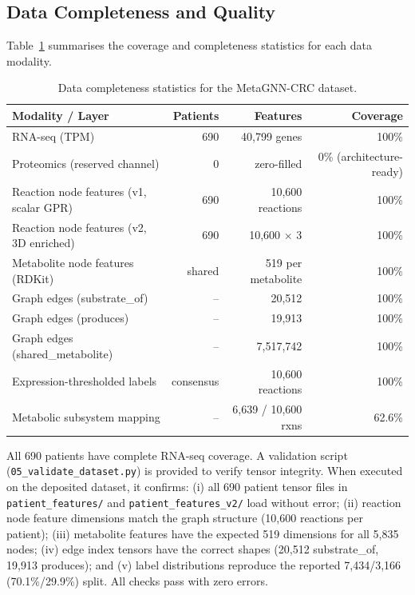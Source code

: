 \documentclass[12pt,a4paper]{article}
\begin{document}
\subsection{Data Completeness and Quality}

Table~\ref{tab:completeness} summarises the coverage and completeness statistics for each data modality.

\begin{table}[!htbp]
\centering
\caption{Data completeness statistics for the MetaGNN-CRC dataset.}
\label{tab:completeness}
\small
\begin{tabularx}{\textwidth}{@{}Xrrr@{}}
\toprule
\textbf{Modality / Layer} & \textbf{Patients} & \textbf{Features} & \textbf{Coverage} \\
\midrule
RNA-seq (TPM) & 690 & 40,799 genes & 100\% \\
Proteomics (reserved channel) & 0 & zero-filled & 0\% (architecture-ready) \\
Reaction node features (v1, scalar GPR) & 690 & 10,600 reactions & 100\% \\
Reaction node features (v2, 3D enriched) & 690 & 10,600 $\times$ 3 & 100\% \\
Metabolite node features (RDKit) & shared & 519 per metabolite & 100\% \\
Graph edges (substrate\_of) & -- & 20,512 & 100\% \\
Graph edges (produces) & -- & 19,913 & 100\% \\
Graph edges (shared\_metabolite) & -- & 7,517,742 & 100\% \\
Expression-thresholded labels & consensus & 10,600 reactions & 100\% \\
Metabolic subsystem mapping & -- & 6,639 / 10,600 rxns & 62.6\% \\
\bottomrule
\end{tabularx}
\end{table}

All 690 patients have complete RNA-seq coverage.
A validation script (\texttt{05\_validate\_\allowbreak dataset.py}) is provided to verify tensor integrity. When executed on the deposited dataset, it confirms: (i) all 690 patient tensor files in \texttt{patient\_features/} and \texttt{patient\_features\_v2/} load without error; (ii) reaction node feature dimensions match the graph structure (10,600 reactions per patient); (iii) metabolite features have the expected 519 dimensions for all 5,835 nodes; (iv) edge index tensors have the correct shapes (20,512 substrate\_of, 19,913 produces); and (v) label distributions reproduce the reported 7,434/3,166 (70.1\%/29.9\%) split. All checks pass with zero errors.
\end{document}
